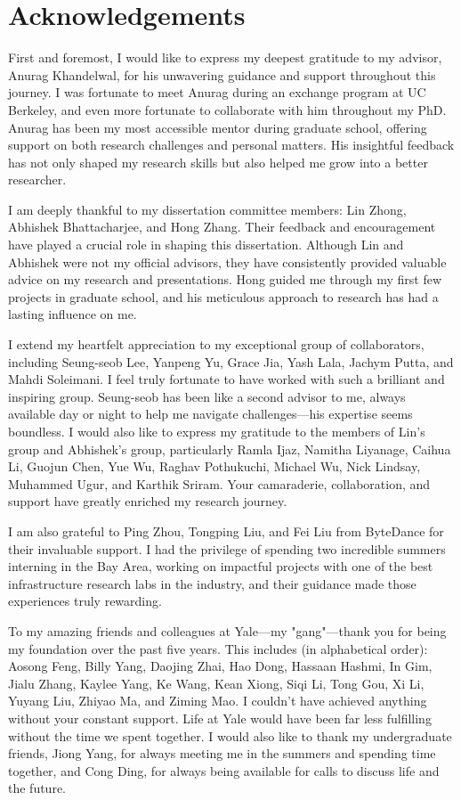 \chapter{Acknowledgements} %
First and foremost, I would like to express my deepest gratitude to my advisor, Anurag Khandelwal, for his unwavering guidance and support throughout this journey. I was fortunate to meet Anurag during an exchange program at UC Berkeley, and even more fortunate to collaborate with him throughout my PhD. Anurag has been my most accessible mentor during graduate school, offering support on both research challenges and personal matters. His insightful feedback has not only shaped my research skills but also helped me grow into a better researcher.

I am deeply thankful to my dissertation committee members: Lin Zhong, Abhishek Bhattacharjee, and Hong Zhang. Their feedback and encouragement have played a crucial role in shaping this dissertation. Although Lin and Abhishek were not my official advisors, they have consistently provided valuable advice on my research and presentations. Hong guided me through my first few projects in graduate school, and his meticulous approach to research has had a lasting influence on me.

I extend my heartfelt appreciation to my exceptional group of collaborators, including Seung-seob Lee, Yanpeng Yu, Grace Jia, Yash Lala, Jachym Putta, and Mahdi Soleimani. I feel truly fortunate to have worked with such a brilliant and inspiring group. Seung-seob has been like a second advisor to me, always available day or night to help me navigate challenges—his expertise seems boundless. I would also like to express my gratitude to the members of Lin's group and Abhishek's group, particularly Ramla Ijaz, Namitha Liyanage, Caihua Li, Guojun Chen, Yue Wu, Raghav Pothukuchi, Michael Wu, Nick Lindsay, Muhammed Ugur, and Karthik Sriram. Your camaraderie, collaboration, and support have greatly enriched my research journey.

I am also grateful to Ping Zhou, Tongping Liu, and Fei Liu from ByteDance for their invaluable support. I had the privilege of spending two incredible summers interning in the Bay Area, working on impactful projects with one of the best infrastructure research labs in the industry, and their guidance made those experiences truly rewarding.

To my amazing friends and colleagues at Yale—my "gang"—thank you for being my foundation over the past five years. This includes (in alphabetical order): Aosong Feng, Billy Yang, Daojing Zhai, Hao Dong, Hassaan Hashmi, In Gim, Jialu Zhang, Kaylee Yang, Ke Wang, Kean Xiong, Siqi Li, Tong Gou, Xi Li, Yuyang Liu, Zhiyao Ma, and Ziming Mao. I couldn’t have achieved anything without your constant support. Life at Yale would have been far less fulfilling without the time we spent together. I would also like to thank my undergraduate friends, Jiong Yang, for always meeting me in the summers and spending time together, and Cong Ding, for always being available for calls to discuss life and the future.

